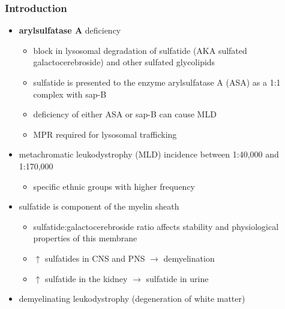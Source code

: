 \documentclass[12pt]{scrartcl}
\begin{document}
\subsubsection{Introduction}
\label{sec:org6f019c1}
\begin{itemize}
\item \textbf{arylsulfatase A} deficiency
\begin{itemize}
\item block in lysosomal degradation of sulfatide (AKA sulfated
galactocerebroside) and other sulfated glycolipids
\item sulfatide is presented to the enzyme arylsulfatase A (ASA) as a
1:1 complex with sap-B
\item deficiency of either ASA or sap-B can cause MLD
\item MPR required for lysosomal trafficking
\end{itemize}
\item metachromatic leukodystrophy (MLD) incidence between 1:40,000 and 1:170,000
\begin{itemize}
\item specific ethnic groups with higher frequency
\end{itemize}

\item sulfatide is component of the myelin sheath
\begin{itemize}
\item sulfatide:galactocerebroside ratio affects stability and
physiological properties of this membrane
\item \(\uparrow\) sulfatides in CNS and PNS \(\to\) demyelination
\item \(\uparrow\) sulfatide in the kidney \(\to\) sulfatide in urine
\end{itemize}
\item demyelinating leukodystrophy (degeneration of white matter)
\end{itemize}
\end{document}
